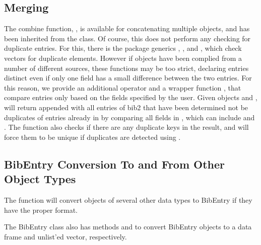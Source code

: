 \documentclass[article]{jss}\usepackage[]{graphicx}\usepackage[]{color}
\begin{document}
\subsection{Merging}
The combine function, , is available for concatenating multiple  objects, and has been inherited from the  class.  Of course, this does not perform any checking for duplicate entries.  For this, there is the  package generics , , and , which check vectors for duplicate elements.  However if  objects have been complied from a number of different sources, these functions may be too strict, declaring entries distinct even if only one field has a small difference between the two entries.  For this reason, we provide an additional operator  and a wrapper function , that compare entries only based on the fields specified by the user.  Given  objects  and ,  will return  appended with all entries of bib2 that have been determined not be duplicates of entries already in  by comparing all fields in , which can include  and .  The function also checks if there are any duplicate keys in the result, and will force them to be unique if duplicates are detected using . 
\subsection{BibEntry Conversion To and From Other Object Types}
The  function will convert objects of several other data types to BibEntry if they have the proper format.

The BibEntry class also has methods  and  to convert BibEntry objects to a data frame and unlist'ed vector, respectively.

\end{document}
